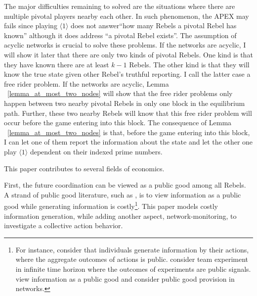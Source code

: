 \documentclass[12pt,letter]{article}
\theoremstyle{definition}
\theoremstyle{remark}
\theoremstyle{claim}
\begin{document}
The major difficulties remaining to solved are the situations where there are multiple pivotal players nearby each other. In such phenomenon, the APEX may fails since playing $\langle 1 \rangle$ does not answer``how many Rebels a pivotal Rebel has known'' although it does address ``a pivotal Rebel exists''. The assumption of acyclic networks is crucial to solve these problems. If the networks are acyclic, I will show it later that there are only two kinds of pivotal Rebels. One kind is that they have known there are at least $k-1$ Rebels. The other kind is that they will know the true state given other Rebel's truthful reporting. I call the latter case a free rider problem. If the networks are acyclic, Lemma ~\ref{lemma_at_most_two_nodes} will show that the free rider problems only happen between two nearby pivotal Rebels in only one block in the equilibrium path. Further, these two nearby Rebels will know that this free rider problem will occur before the game entering into this block. The consequence of Lemma ~\ref{lemma_at_most_two_nodes} is that, before the game entering into this block, I can let one of them report the information about the state and let the other one play $\langle 1 \rangle$ dependent on their indexed prime numbers. 





This paper contributes to several fields of economics. 

First, the future coordination can be viewed as a public good among all Rebels. A strand of public good literature, such as \citep{Lohmann1994}, is to view information as a public good while generating information is costly\footnote{For instance, \citep{Lohmann1993}\citep{Lohmann1994} consider that individuals generate information by their actions, where the aggregate outcomes of actions is public. \citep{Bolto_Harris1999} consider team experiment in infinite time horizon where the outcomes of experiments are public signals. \citep{Bramoulle2007} view information as a public good and consider public good provision in networks.}. This paper models costly information generation, while adding another aspect, network-monitoring, to investigate a collective action behavior.
\end{document}
